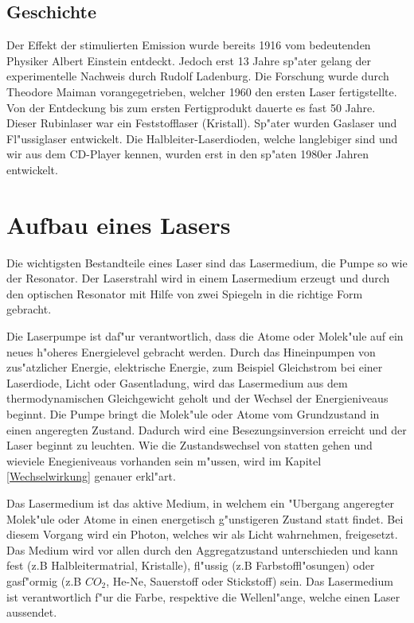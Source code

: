 \begin{refsection}
\subsection{Geschichte}

Der Effekt der stimulierten Emission wurde bereits 1916 vom bedeutenden 
Physiker Albert Einstein entdeckt. Jedoch erst 13 Jahre sp"ater gelang der 
experimentelle Nachweis durch Rudolf Ladenburg. Die Forschung wurde durch 
Theodore Maiman vorangegetrieben, welcher 1960 den ersten Laser 
fertigstellte. Von der Entdeckung bis zum ersten Fertigprodukt dauerte es 
fast 50 Jahre. Dieser Rubinlaser war ein Feststofflaser (Kristall). Sp"ater 
wurden Gaslaser und Fl"ussiglaser entwickelt. Die Halbleiter-Laserdioden, 
welche langlebiger sind und wir aus dem CD-Player kennen, wurden erst in den 
sp"aten 1980er Jahren entwickelt.


\section{Aufbau eines Lasers}

Die wichtigsten Bestandteile eines Laser sind das Lasermedium, die Pumpe so 
wie der Resonator. Der Laserstrahl wird in einem Lasermedium erzeugt und 
durch den optischen Resonator mit Hilfe von zwei Spiegeln in die richtige 
Form gebracht. 

Die Laserpumpe ist daf"ur verantwortlich, dass die Atome oder Molek"ule auf 
ein neues h"oheres Energielevel gebracht werden. Durch das Hineinpumpen von 
zus"atzlicher Energie, elektrische Energie, 
zum Beispiel Gleichstrom bei einer Laserdiode, Licht oder 
Gasentladung, wird das Lasermedium aus dem thermodynamischen Gleichgewicht 
geholt und der Wechsel der Energieniveaus beginnt. Die Pumpe bringt die 
Molek"ule oder Atome vom Grundzustand in einen angeregten Zustand. Dadurch 
wird eine Besezungsinversion erreicht und der Laser beginnt zu leuchten. Wie 
die Zustandswechsel von statten gehen und wieviele Enegieniveaus vorhanden 
sein m"ussen, wird im Kapitel \ref{Wechselwirkung} genauer erkl"art.

Das Lasermedium ist das aktive Medium, in welchem ein "Ubergang angeregter 
Molek"ule oder Atome in einen energetisch g"unstigeren Zustand statt findet. 
Bei diesem Vorgang wird ein Photon, welches wir als Licht wahrnehmen, 
freigesetzt. Das Medium wird vor allen durch den Aggregatzustand 
unterschieden und kann fest (z.B Halbleitermatrial, Kristalle), fl"ussig (z.B 
Farbstoffl"osungen) oder gasf"ormig (z.B $CO_{2}$, He-Ne, Sauerstoff oder 
Stickstoff) sein. Das Lasermedium ist verantwortlich f"ur die Farbe, 
respektive die Wellenl"ange, welche einen Laser aussendet.


\end{refsection}
